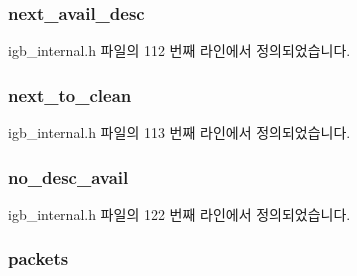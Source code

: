 \subsubsection[{\texorpdfstring{next\+\_\+avail\+\_\+desc}{next_avail_desc}}]{ next\+\_\+avail\+\_\+desc}\hypertarget{structtx__ring_a11612fa87762d1d1e6a7eccfb865b805}{}\label{structtx__ring_a11612fa87762d1d1e6a7eccfb865b805}


igb\+\_\+internal.\+h 파일의 112 번째 라인에서 정의되었습니다.

\subsubsection[{\texorpdfstring{next\+\_\+to\+\_\+clean}{next_to_clean}}]{ next\+\_\+to\+\_\+clean}\hypertarget{structtx__ring_a6b93808fe90341d9209770bf06dcdc6c}{}\label{structtx__ring_a6b93808fe90341d9209770bf06dcdc6c}


igb\+\_\+internal.\+h 파일의 113 번째 라인에서 정의되었습니다.

\subsubsection[{\texorpdfstring{no\+\_\+desc\+\_\+avail}{no_desc_avail}}]{ no\+\_\+desc\+\_\+avail}\hypertarget{structtx__ring_a145e411f042377d5944c920fc219fbe7}{}\label{structtx__ring_a145e411f042377d5944c920fc219fbe7}


igb\+\_\+internal.\+h 파일의 122 번째 라인에서 정의되었습니다.

\subsubsection[{\texorpdfstring{packets}{packets}}]{ packets}\hypertarget{structtx__ring_a5ff69346aaa72fb9bf0c095156ddccbb}{}\label{structtx__ring_a5ff69346aaa72fb9bf0c095156ddccbb}


